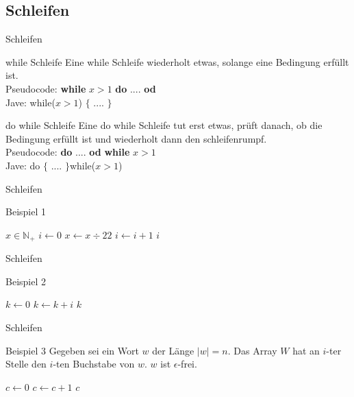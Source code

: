 	
	\subsection{Schleifen}
	\begin{frame}{Schleifen}
		\begin{block}{while Schleife}
			Eine while Schleife wiederholt etwas, solange eine Bedingung erfüllt ist.\\
			Pseudocode: \textbf{while} $x > 1$ \textbf{do} .... \textbf{od}\\
			Jave: while($x > 1$) $\{$ .... $\}$
		\end{block}	
		
			
		\begin{block}{do while Schleife}
			Eine do while Schleife tut erst etwas, prüft danach, ob die Bedingung erfüllt ist und wiederholt dann den schleifenrumpf.\\
			Pseudocode:  \textbf{do} .... \textbf{od} \textbf{while} $x > 1$\\
			Jave: do $\{$ .... $\}$while($x > 1$)
		\end{block}		
	\end{frame}
	
	
	\begin{frame}{Schleifen}
		\begin {exampleblock}{Beispiel 1}
     		\begin{algorithmic}
                \Require $x \in \mathbb{N}_+$
                \State $i \gets 0$
                    \State $x\gets x \div2 2$
                    \State $i\gets i + 1$
                \EndWhile
                \Ensure $i$
        	\end{algorithmic}
        \end{exampleblock}
	\end{frame}
	

	\begin{frame}{Schleifen}
		\begin{exampleblock}{Beispiel 2}
			\begin{algorithmic}
				\State $k \gets 0$
				\For{i}{0}{20}
					\State $k\gets k+i$
				\EndFor
				\Ensure $k$
			\end{algorithmic}
		\end{exampleblock}
	\end{frame}
	
	\begin{frame}{Schleifen}
    	\begin{exampleblock}{Beispiel 3}
        	Gegeben sei ein Wort $w$ der Länge $\left| w\right| = n$. 
        	Das Array $W$ hat an $i$-ter Stelle den $i$-ten Buchstabe von $w$.
        	$w$ ist $\epsilon$-frei.
            \begin{algorithmic}
                \State $c \gets 0$
                	\If{$A[i\,] = $'x'}
                		\State $c \gets c+1$
    				\EndIf
                \EndFor
                \Ensure $c$
            \end{algorithmic}
    	\end{exampleblock}
	\end{frame}
	

